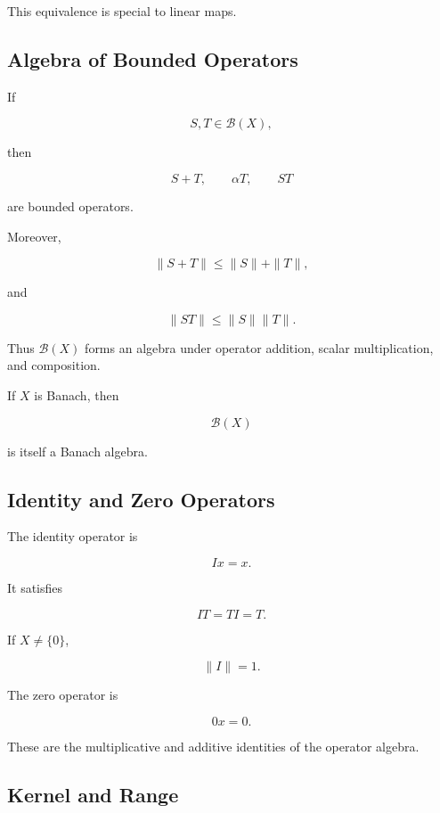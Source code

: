 This equivalence is special to linear maps.

\subsection{Algebra of Bounded Operators}
\label{subsec:operator-algebra}

If

\[
S,T\in\mathcal{B}(X),
\]

then

\[
S+T,
\qquad
\alpha T,
\qquad
ST
\]

are bounded operators.

Moreover,

\[
\boxed{
\|S+T\|
\leq
\|S\|+\|T\|,
}
\]

and

\[
\boxed{
\|ST\|
\leq
\|S\|\|T\|.
}
\]

Thus \(\mathcal{B}(X)\) forms an algebra under operator addition,
scalar multiplication, and composition.

If \(X\) is Banach, then

\[
\boxed{
\mathcal{B}(X)
}
\]

is itself a Banach algebra.

\subsection{Identity and Zero Operators}
\label{subsec:identity-zero-operators}

The identity operator is

\[
\boxed{
Ix=x.
}
\]

It satisfies

\[
\boxed{
IT=TI=T.
}
\]

If \(X\neq\{0\}\),

\[
\boxed{
\|I\|=1.
}
\]

The zero operator is

\[
\boxed{
0x=0.
}
\]

These are the multiplicative and additive identities of the operator
algebra.

\subsection{Kernel and Range}
\label{subsec:operator-kernel-range}

